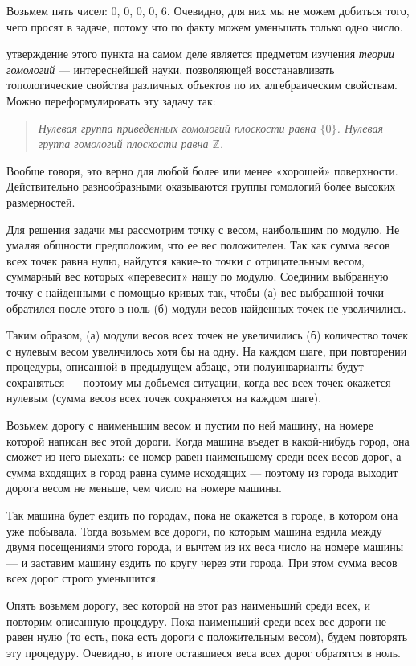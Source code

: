 ﻿
\begin{itemize}
\itA Возьмем пять чисел: 0, 0, 0, 0, 6. Очевидно, для них мы не можем добиться того, чего просят в задаче, потому что по факту можем уменьшать только одно число.

 утверждение этого пункта на самом деле является предметом изучения {\itshape теории гомологий} — интереснейшей науки, позволяющей восстанавливать топологические свойства различных объектов по их алгебраическим свойствам. Можно переформулировать эту задачу так:

\begin{quote} \itshape
	Нулевая группа приведенных гомологий плоскости равна $\{0\}$. Нулевая группа гомологий плоскости равна $\mathbb Z$.
\end{quote}

Вообще говоря, это верно для любой более или менее «хорошей» поверхности. Действительно разнообразными оказываются группы гомологий более высоких размерностей.

Для решения задачи мы рассмотрим точку с весом, наибольшим по модулю. Не умаляя общности предположим, что ее вес положителен. Так как сумма весов всех точек равна нулю, найдутся какие-то точки с отрицательным весом, суммарный вес которых «перевесит» нашу по модулю. Соединим выбранную точку с найденными с помощью кривых так, чтобы (а) вес выбранной точки обратился после этого в ноль (б) модули весов найденных точек не увеличились.

Таким образом, (а) модули весов всех точек не увеличились (б) количество точек с нулевым весом увеличилось хотя бы на одну. На каждом шаге, при повторении процедуры, описанной в предыдущем абзаце, эти полуинварианты будут сохраняться — поэтому мы добьемся ситуации, когда вес всех точек окажется нулевым (сумма весов всех точек сохраняется на каждом шаге).

\itC Возьмем дорогу с наименьшим весом и пустим по ней машину, на номере которой написан вес этой дороги. Когда машина въедет в какой-нибудь город, она сможет из него выехать: ее номер равен наименьшему среди всех весов дорог, а сумма входящих в город равна сумме исходящих — поэтому из города выходит дорога весом не меньше, чем число на номере машины.

Так машина будет ездить по городам, пока не окажется в городе, в котором она уже побывала. Тогда возьмем все дороги, по которым машина ездила между двумя посещениями этого города, и вычтем из их веса число на номере машины — и заставим машину ездить по кругу через эти города. При этом сумма весов всех дорог строго уменьшится.

Опять возьмем дорогу, вес которой на этот раз наименьший среди всех, и повторим описанную процедуру. Пока наименьший среди всех вес дороги не равен нулю (то есть, пока есть дороги с положительным весом), будем повторять эту процедуру. Очевидно, в итоге оставшиеся веса всех дорог обратятся в ноль.
\end{itemize}